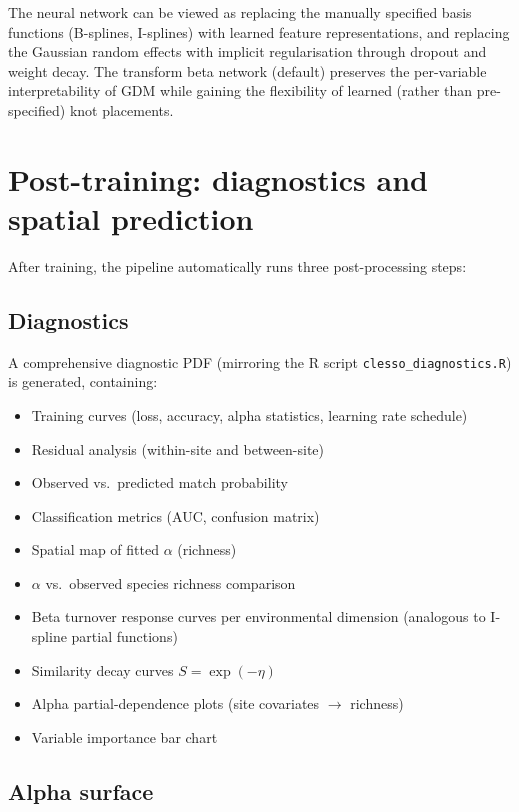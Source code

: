 \documentclass{article}
\begin{document}
The neural network can be viewed as replacing the manually specified basis functions (B-splines, I-splines) with learned feature representations, and replacing the Gaussian random effects with implicit regularisation through dropout and weight decay. The transform beta network (default) preserves the per-variable interpretability of GDM while gaining the flexibility of learned (rather than pre-specified) knot placements.

\section{Post-training: diagnostics and spatial prediction}

After training, the pipeline automatically runs three post-processing steps:

\subsection{Diagnostics}

A comprehensive diagnostic PDF (mirroring the R script \texttt{clesso\_diagnostics.R}) is generated, containing:
\begin{itemize}
    \item Training curves (loss, accuracy, alpha statistics, learning rate schedule)
    \item Residual analysis (within-site and between-site)
    \item Observed vs.\ predicted match probability
    \item Classification metrics (AUC, confusion matrix)
    \item Spatial map of fitted $\alpha$ (richness)
    \item $\alpha$ vs.\ observed species richness comparison
    \item Beta turnover response curves per environmental dimension (analogous to I-spline partial functions)
    \item Similarity decay curves $S = \exp(-\eta)$
    \item Alpha partial-dependence plots (site covariates $\to$ richness)
    \item Variable importance bar chart
\end{itemize}

\subsection{Alpha surface}
\end{document}
